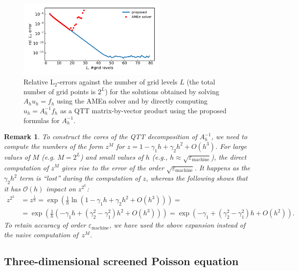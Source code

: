 \documentclass[a4paper]{article}
\newtheorem{remark}{Remark}[section]
\newcommand{\LL}{L}
\begin{document}
\begin{figure}
    \centering
    \includegraphics[width=0.65\textwidth]{robust.pdf}
    \caption{Relative $\mathrm{L}_2$-errors against the number of grid levels $\LL$ (the total number of grid points is $2^\LL$) for the solutions obtained by solving $A_h u_h = f_h$ using the AMEn solver and by directly computing $u_h = A_h^{-1}f_h$ as a QTT matrix-by-vector product using the proposed formulas for $A_h^{-1}$.}
    \label{fig:numerical}
\end{figure}

\begin{remark}
To construct the cores of the QTT decomposition of $A_h^{-1}$, we need to compute the numbers of the form $z^M$ for $z = 1 - \gamma_1 h + \gamma_2 h^2 + O(h^3)$.
For large values of $M$ (e.g. $M = 2^\LL$) and small values of $h$ (e.g., $h \approx \sqrt{\varepsilon_{\mathrm{machine}}}$), the direct computation of $z^M$ gives rise to the error of the order $\sqrt{\varepsilon_{\mathrm{machine}}}$.
It happens as the $\gamma_2h^2$ term is ``lost'' during the computation of $z$, whereas the following shows that it has $\mathcal{O}(h)$ impact on $z^{2^L}$:
\begin{align*}
z^{2^L} &= z^{\frac{1}{h}} = \exp\left(\frac{1}{h}\ln(1 - \gamma_1 h + \gamma_2 h^2 + O(h^3))\right) = \\ &= \exp\left(\frac{1}{h}(-\gamma_1 h + (\gamma_2^2-\gamma_1^2)h^2 + O(h^3))\right)
= \exp(-\gamma_1 + (\gamma_2^2 - \gamma_1^2)h + O(h^2)).
\end{align*}
To retain accuracy of order $\varepsilon_{\mathrm{machine}}$, we have used the above expansion instead of the naive computation of~$z^M$.
\end{remark}


\subsection{Three-dimensional screened Poisson equation}
\end{document}
